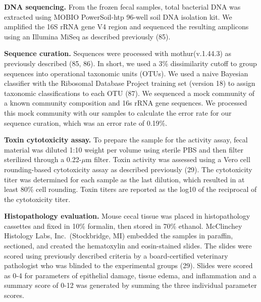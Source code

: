 \documentclass[
  12pt,
]{article}
\begin{document}
\textbf{DNA sequencing.} From the frozen fecal samples, total bacterial
DNA was extracted using MOBIO PowerSoil-htp 96-well soil DNA isolation
kit. We amplified the 16S rRNA gene V4 region and sequenced the
resulting amplicons using an Illumina MiSeq as described previously
(85).

\textbf{Sequence curation.} Sequences were processed with
mothur(v.1.44.3) as previously described (85, 86). In short, we used a
3\% dissimilarity cutoff to group sequences into operational taxonomic
units (OTUs). We used a naive Bayesian classifier with the Ribosomal
Database Project training set (version 18) to assign taxonomic
classifications to each OTU (87). We sequenced a mock community of a
known community composition and 16s rRNA gene sequences. We processed
this mock community with our samples to calculate the error rate for our
sequence curation, which was an error rate of 0.19\%.

\textbf{Toxin cytotoxicity assay.} To prepare the sample for the
activity assay, fecal material was diluted 1:10 weight per volume using
sterile PBS and then filter sterilized through a 0.22-\(\mu\)m filter.
Toxin activity was assessed using a Vero cell rounding-based
cytotoxicity assay as described previously (29). The cytotoxicity titer
was determined for each sample as the last dilution, which resulted in
at least 80\% cell rounding. Toxin titers are reported as the log10 of
the reciprocal of the cytotoxicity titer.

\textbf{Histopathology evaluation.} Mouse cecal tissue was placed in
histopathology cassettes and fixed in 10\% formalin, then stored in 70\%
ethanol. McClinchey Histology Labs, Inc.~(Stockbridge, MI) embedded the
samples in paraffin, sectioned, and created the hematoxylin and
eosin-stained slides. The slides were scored using previously described
criteria by a board-certified veterinary pathologist who was blinded to
the experimental groups (29). Slides were scored as 0-4 for parameters
of epithelial damage, tissue edema, and inflammation and a summary score
of 0-12 was generated by summing the three individual parameter scores.
\end{document}
